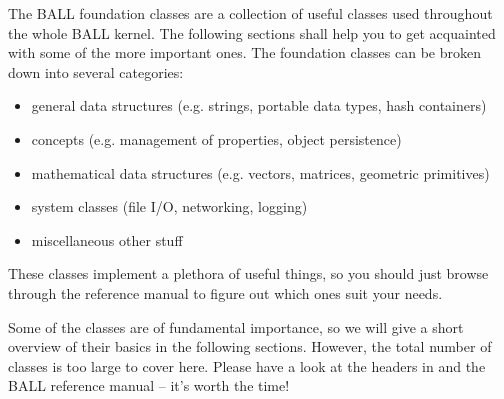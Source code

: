 \label{section:kernel-data-structures}
The BALL foundation classes are a collection of useful classes used throughout
the whole BALL kernel. The following sections shall help you to get acquainted
with some of the more important ones. The foundation classes can be broken down
into several categories:
\begin{itemize}
	\item general data structures (e.g. strings, portable data types, hash
			containers)
	\item concepts (e.g. management of properties, object persistence)
	\item mathematical data structures (e.g. vectors, matrices, geometric
				primitives)
	\item system classes (file I/O, networking, logging)
	\item miscellaneous other stuff
\end{itemize}
These classes implement a plethora of useful things, so you should just browse
through the reference manual to figure out which ones suit your needs. 

Some of the classes are of fundamental importance, so we will give a short overview
of their basics in the following sections. However, the total number of classes
is too large to cover here. Please have a look at the headers in 
 and the
BALL reference manual -- it's worth the time!
